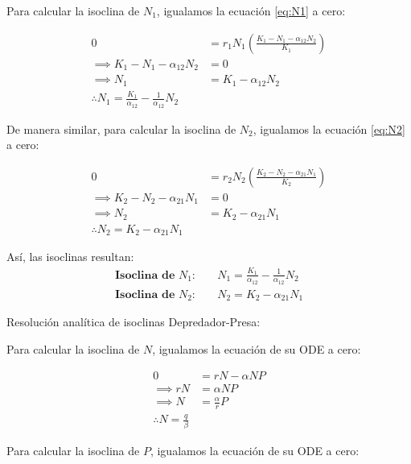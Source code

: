 \documentclass{article}
\begin{document}
Para calcular la isoclina de \(N_1\), igualamos la ecuación \eqref{eq:N1} a cero:
\vspace{1\baselineskip}

\begin{align*}
0 &= r_1N_1\left(\frac{K_1 - N_1 - \alpha_{12}N_2}{K_1}\right) \\
\implies K_1 - N_1 - \alpha_{12}N_2 &= 0 \\
\implies N_1 &= K_1 - \alpha_{12}N_2 \\
\therefore \boxed{N_1 = \frac{K_1}{\alpha_{12}} - \frac{1}{\alpha_{12}}N_2}
\end{align*}

De manera similar, para calcular la isoclina de \(N_2\), igualamos la ecuación \eqref{eq:N2} a cero:
\vspace{1\baselineskip}

\begin{align*}
0 &= r_2N_2\left(\frac{K_2 - N_2 - \alpha_{21}N_1}{K_2}\right) \\
\implies K_2 - N_2 - \alpha_{21}N_1 &= 0 \\
\implies N_2 &= K_2 - \alpha_{21}N_1 \\
\therefore \boxed{N_2 = K_2 - \alpha_{21}N_1}
\end{align*}

Así, las isoclinas resultan:
\begin{align*}
\textbf{Isoclina de }N_1: &\quad N_1 = \frac{K_1}{\alpha_{12}} - \frac{1}{\alpha_{12}}N_2 \\
\textbf{Isoclina de }N_2: &\quad N_2 = K_2 - \alpha_{21}N_1
\end{align*}


\vspace{1\baselineskip}

\noindent Resolución analítica de isoclinas Depredador-Presa:
\vspace{1\baselineskip}

Para calcular la isoclina de \(N\), igualamos la ecuación de su ODE a cero:
\vspace{1\baselineskip}

\begin{align*}
0 &= rN - \alpha NP \\
\implies rN &= \alpha NP \\
\implies N &= \frac{\alpha}{r}P \\
\therefore \boxed{N = \frac{q}{\beta}}
\end{align*}

Para calcular la isoclina de \(P\), igualamos la ecuación de su ODE a cero:
\vspace{1\baselineskip}
\end{document}

